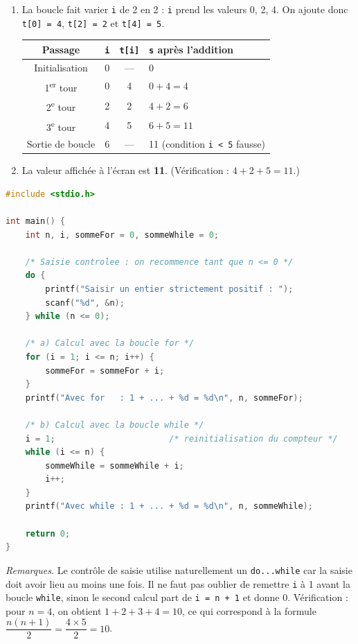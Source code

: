 \documentclass[11pt]{article}
\newcounter{popsec}
\newcounter{popsub}
\newcommand{\courssub}[1]{%
  \stepcounter{popsub}%
  \par\vspace{9pt}\noindent{\popxbold\fontsize{11.5}{13}\selectfont\color{popink}{\color{poporange}\thepopsec.\thepopsub}\hspace{6pt}#1}\par\nopagebreak\vspace{4pt}
}
\begin{document}
\begin{corrige}
\begin{enumerate}
\item La boucle fait varier \texttt{i} de 2 en 2 : \texttt{i} prend les valeurs 0, 2, 4. On ajoute donc \texttt{t[0] = 4}, \texttt{t[2] = 2} et \texttt{t[4] = 5}.
\begin{center}
\begin{tabularx}{\linewidth}{|c|c|c|X|}
\hline
\rowcolor{popblueL} Passage & \texttt{i} & \texttt{t[i]} & \texttt{s} après l'addition \\
\hline
Initialisation & 0 & --- & 0 \\
\hline
1\textsuperscript{er} tour & 0 & 4 & $0 + 4 = 4$ \\
\hline
2\textsuperscript{e} tour & 2 & 2 & $4 + 2 = 6$ \\
\hline
3\textsuperscript{e} tour & 4 & 5 & $6 + 5 = 11$ \\
\hline
Sortie de boucle & 6 & --- & 11 (condition \texttt{i < 5} fausse) \\
\hline
\end{tabularx}
\end{center}
\item La valeur affichée à l'écran est \textbf{11}. (Vérification : $4 + 2 + 5 = 11$.)
\end{enumerate}
\end{corrige}

\courssub{Corrigés — Je m'entraîne}

\begin{corrige}
\begin{lstlisting}[language=C]
#include <stdio.h>

int main() {
    int n, i, sommeFor = 0, sommeWhile = 0;

    /* Saisie controlee : on recommence tant que n <= 0 */
    do {
        printf("Saisir un entier strictement positif : ");
        scanf("%d", &n);
    } while (n <= 0);

    /* a) Calcul avec la boucle for */
    for (i = 1; i <= n; i++) {
        sommeFor = sommeFor + i;
    }
    printf("Avec for   : 1 + ... + %d = %d\n", n, sommeFor);

    /* b) Calcul avec la boucle while */
    i = 1;                       /* reinitialisation du compteur */
    while (i <= n) {
        sommeWhile = sommeWhile + i;
        i++;
    }
    printf("Avec while : 1 + ... + %d = %d\n", n, sommeWhile);

    return 0;
}
\end{lstlisting}
\emph{Remarques.} Le contrôle de saisie utilise naturellement un \texttt{do...while} car la saisie doit avoir lieu au moins une fois. Il ne faut pas oublier de remettre \texttt{i} à 1 avant la boucle \texttt{while}, sinon le second calcul part de \texttt{i = n + 1} et donne 0. Vérification : pour $n = 4$, on obtient $1+2+3+4 = 10$, ce qui correspond à la formule $\dfrac{n(n+1)}{2} = \dfrac{4 \times 5}{2} = 10$.
\end{corrige}
\end{document}
